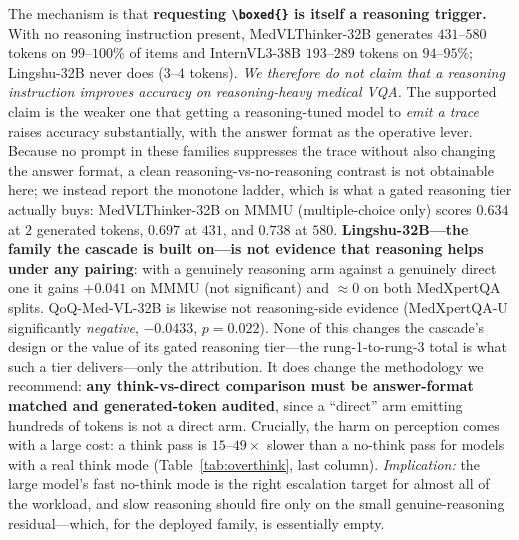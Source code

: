 \documentclass[conference]{IEEEtran}
\begin{document}
The mechanism is that \textbf{requesting \texttt{\textbackslash boxed\{\}} is itself a reasoning trigger.} With no reasoning instruction present, MedVLThinker-32B generates $431$--$580$ tokens on $99$--$100\%$ of items and InternVL3-38B $193$--$289$ tokens on $94$--$95\%$; Lingshu-32B never does ($3$--$4$ tokens). \emph{We therefore do not claim that a reasoning instruction improves accuracy on reasoning-heavy medical VQA.} The supported claim is the weaker one that getting a reasoning-tuned model to \emph{emit a trace} raises accuracy substantially, with the answer format as the operative lever. Because no prompt in these families suppresses the trace without also changing the answer format, a clean reasoning-vs-no-reasoning contrast is not obtainable here; we instead report the monotone ladder, which is what a gated reasoning tier actually buys: MedVLThinker-32B on MMMU (multiple-choice only) scores $0.634$ at $2$ generated tokens, $0.697$ at $431$, and $0.738$ at $580$. \textbf{Lingshu-32B---the family the cascade is built on---is not evidence that reasoning helps under any pairing}: with a genuinely reasoning arm against a genuinely direct one it gains $+0.041$ on MMMU (not significant) and $\approx0$ on both MedXpertQA splits. QoQ-Med-VL-32B is likewise not reasoning-side evidence (MedXpertQA-U significantly \emph{negative}, $-0.0433$, $p{=}0.022$). None of this changes the cascade's design or the value of its gated reasoning tier---the rung-1-to-rung-3 total is what such a tier delivers---only the attribution. It does change the methodology we recommend: \textbf{any think-vs-direct comparison must be answer-format matched and generated-token audited}, since a ``direct'' arm emitting hundreds of tokens is not a direct arm. Crucially, the harm on perception comes with a large cost: a think pass is $15$--$49\times$ slower than a no-think pass for models with a real think mode (Table~\ref{tab:overthink}, last column). \emph{Implication:} the large model's fast no-think mode is the right escalation target for almost all of the workload, and slow reasoning should fire only on the small genuine-reasoning residual---which, for the deployed family, is essentially empty.
\end{document}
